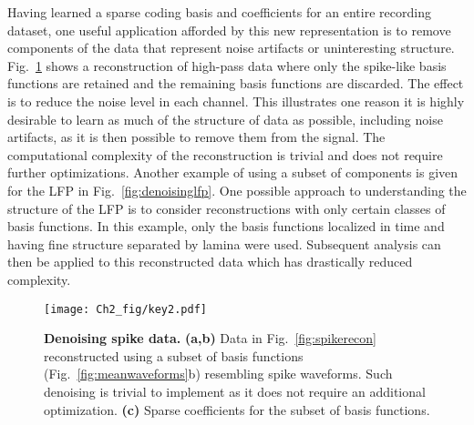 Having learned a sparse coding basis and coefficients for an entire
recording dataset, one useful application afforded by this new
representation is to remove components of the data that represent
noise artifacts or uninteresting structure. Fig.~\ref{fig:denoising}
shows a reconstruction of high-pass data where only the spike-like
basis functions are retained and the remaining basis functions are
discarded. The effect is to reduce the noise level in each
channel. This illustrates one reason it is highly desirable to learn
as much of the structure of data as possible, including noise
artifacts, as it is then possible to remove them from the signal. The
computational complexity of the reconstruction is trivial and does not
require further optimizations. Another example of using a subset of
components is given for the LFP in Fig.~\ref{fig:denoisinglfp}. One
possible approach to understanding the structure of the LFP is to
consider reconstructions with only certain classes of basis
functions. In this example, only the basis functions localized in time
and having fine structure separated by lamina were used. Subsequent
analysis can then be applied to this reconstructed data which has
drastically reduced complexity.

\begin{figure}[htp!]
  \centering
  \texttt{[image: Ch2\_fig/key2.pdf]}
  \caption{\textbf{Denoising spike data.} \textbf{(a,b)} Data in
    Fig.~\ref{fig:spikerecon} reconstructed using a subset of basis
    functions (Fig.~\ref{fig:meanwaveforms}b) resembling spike
    waveforms. Such denoising is trivial to implement as it does not
    require an additional optimization. \textbf{(c)} Sparse
    coefficients for the subset of basis functions.}
  \label{fig:denoising}
\end{figure}


